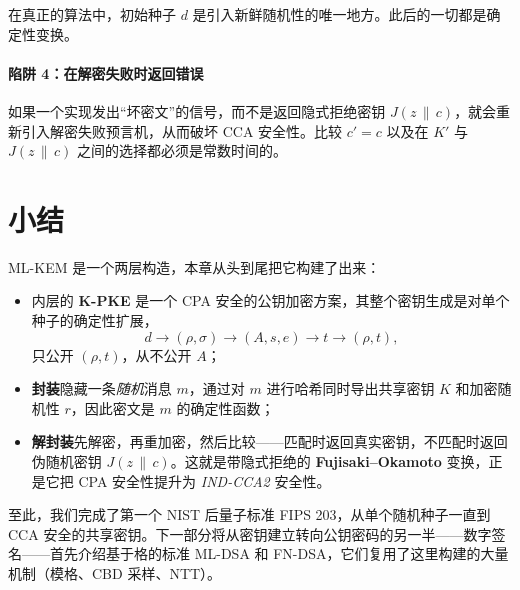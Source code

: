 在真正的算法中，初始种子 $d$ 是引入新鲜随机性的唯一地方。此后的一切都是确定性变换。

\paragraph{陷阱 4：在解密失败时返回错误}

如果一个实现发出“坏密文”的信号，而不是返回隐式拒绝密钥 $J(z\,\|\,c)$，就会重新引入解密失败预言机，从而破坏 CCA 安全性。比较 $c'=c$ 以及在 $K'$ 与 $J(z\,\|\,c)$ 之间的选择都必须是常数时间的。

\section{小结}

ML-KEM 是一个两层构造，本章从头到尾把它构建了出来：

\begin{itemize}
  \item 内层的 \textbf{K-PKE} 是一个 CPA 安全的公钥加密方案，其整个密钥生成是对单个种子的确定性扩展，
  \[
  d \longrightarrow (\rho,\sigma) \longrightarrow (A,s,e) \longrightarrow t \longrightarrow (\rho,t),
  \]
  只公开 $(\rho,t)$，从不公开 $A$；
  \item \textbf{封装}隐藏一条\emph{随机}消息 $m$，通过对 $m$ 进行哈希同时导出共享密钥 $K$ 和加密随机性 $r$，因此密文是 $m$ 的确定性函数；
  \item \textbf{解封装}先解密，再重加密，然后比较——匹配时返回真实密钥，不匹配时返回伪随机密钥 $J(z\,\|\,c)$。这就是带隐式拒绝的 \textbf{Fujisaki--Okamoto} 变换，正是它把 CPA 安全性提升为 \emph{IND-CCA2} 安全性。
\end{itemize}

至此，我们完成了第一个 NIST 后量子标准 FIPS 203，从单个随机种子一直到 CCA 安全的共享密钥。下一部分将从密钥建立转向公钥密码的另一半——数字签名——首先介绍基于格的标准 ML-DSA 和 FN-DSA，它们复用了这里构建的大量机制（模格、CBD 采样、NTT）。

\printbibliography[heading=chapterrefs]
